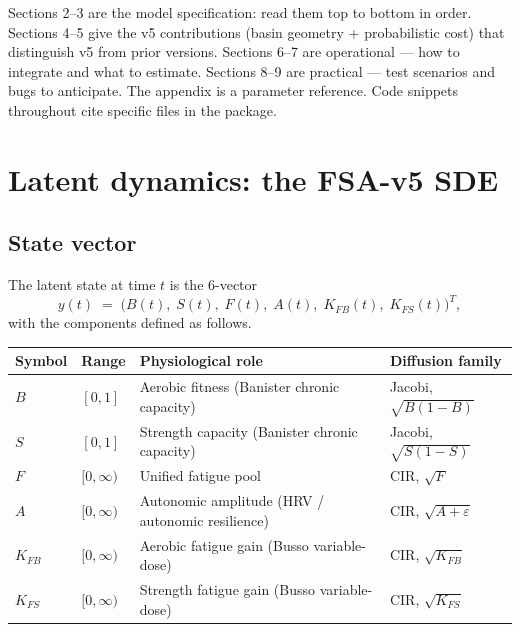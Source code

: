 \documentclass[11pt,a4paper]{article}
\theoremstyle{definition}
\begin{document}
Sections 2--3 are the model specification: read them top to bottom in
order. Sections 4--5 give the v5 contributions (basin geometry +
probabilistic cost) that distinguish v5 from prior versions. Sections
6--7 are operational --- how to integrate and what to estimate.
Sections 8--9 are practical --- test scenarios and bugs to anticipate.
The appendix is a parameter reference. Code snippets throughout cite
specific files in the package.


\section{Latent dynamics: the FSA-v5 SDE} \label{sec:latent}

\subsection{State vector}

The latent state at time $t$ is the 6-vector
\begin{equation}
y(t) \;=\; \big( B(t),\; S(t),\; F(t),\; A(t),\; K_{FB}(t),\; K_{FS}(t)\big)^T,
\end{equation}
with the components defined as follows.

\begin{center}\small
\begin{tabular}{llll}
\toprule
Symbol & Range & Physiological role & Diffusion family \\
\midrule
$B$    & $[0, 1]$        & Aerobic fitness (Banister chronic capacity)         & Jacobi, $\sqrt{B(1-B)}$ \\
$S$    & $[0, 1]$        & Strength capacity (Banister chronic capacity)        & Jacobi, $\sqrt{S(1-S)}$ \\
$F$    & $[0, \infty)$   & Unified fatigue pool                                 & CIR, $\sqrt{F}$ \\
$A$    & $[0, \infty)$   & Autonomic amplitude (HRV / autonomic resilience)     & CIR, $\sqrt{A + \varepsilon}$ \\
$K_{FB}$ & $[0, \infty)$ & Aerobic fatigue gain (Busso variable-dose)           & CIR, $\sqrt{K_{FB}}$ \\
$K_{FS}$ & $[0, \infty)$ & Strength fatigue gain (Busso variable-dose)          & CIR, $\sqrt{K_{FS}}$ \\
\bottomrule
\end{tabular}
\end{center}
\end{document}

